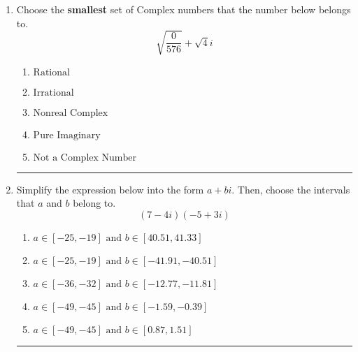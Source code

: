 \documentclass[14pt]{extbook}
\newcommand{\litem}[1]{\item#1\hspace*{-1cm}\rule{\textwidth}{0.4pt}}
\begin{document}
\begin{enumerate}
{\begin{enumerate}[label=\Alph*.]
\end{enumerate} }
\litem{
Choose the \textbf{smallest} set of Complex numbers that the number below belongs to.\[ \sqrt{\frac{0}{576}}+\sqrt{4}i \]\begin{enumerate}[label=\Alph*.]
\item \( \text{Rational} \)
\item \( \text{Irrational} \)
\item \( \text{Nonreal Complex} \)
\item \( \text{Pure Imaginary} \)
\item \( \text{Not a Complex Number} \)

\end{enumerate} }
\litem{
Simplify the expression below into the form $a+bi$. Then, choose the intervals that $a$ and $b$ belong to.\[ (7 - 4 i)(-5 + 3 i) \]\begin{enumerate}[label=\Alph*.]
\item \( a \in [-25, -19] \text{ and } b \in [40.51, 41.33] \)
\item \( a \in [-25, -19] \text{ and } b \in [-41.91, -40.51] \)
\item \( a \in [-36, -32] \text{ and } b \in [-12.77, -11.81] \)
\item \( a \in [-49, -45] \text{ and } b \in [-1.59, -0.39] \)
\item \( a \in [-49, -45] \text{ and } b \in [0.87, 1.51] \)

\end{enumerate} }
\end{enumerate}
\end{document}
